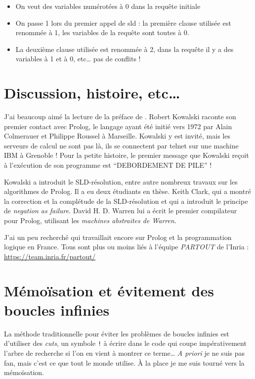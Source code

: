 \documentclass{article}
\begin{document}
\begin{itemize}
  \item
    On veut des variables numérotées à 0 dans la requête initiale
  \item
    On passe 1 lors du premier appel de sld : la première clause utilisée est renommée à 1, les variables de la requête sont toutes à 0.
  \item
    La deuxième clause utilisée est renommée à 2, dans la requête il y a des variables à 1 et à 0, etc\ldots{} pas de conflits !
\end{itemize}



\section{Discussion, histoire, etc\ldots{}}

J'ai beaucoup aimé la lecture de la préface de \cite{Sterling}. Robert Kowalski raconte son premier contact avec Prolog, le langage ayant été initié vers 1972 par Alain Colmerauer et Philippe Roussel à Marseille. Kowalski y est invité, mais les serveurs de calcul ne sont pas là, ils se connectent par telnet sur une machine IBM à Grenoble ! Pour la petite histoire, le premier message que Kowalski reçoit à l'exécution de son programme est ``DEBORDEMENT DE PILE'' !

Kowalski a introduit le SLD-résolution, entre autre nombreux travaux sur les algorithmes de Prolog. Il a eu deux étudiants en thèse. Keith Clark, qui a montré la correction et la complétude de la SLD-résolution et qui a introduit le principe de \emph{negation as failure}. David H. D. Warren lui a écrit le premier compilateur pour Prolog, utilisant les \emph{machines abstraites de Warren}.

J'ai un peu recherché qui travaillait encore sur Prolog et la programmation logique en France. Tous sont plus ou moins liés à l'équipe \emph{PARTOUT} de l'Inria : \url{https://team.inria.fr/partout/}

\section{Mémoïsation et évitement des boucles infinies}

La méthode traditionnelle pour éviter les problèmes de boucles infinies est d'utiliser des \emph{cuts}, un symbole \texttt{!} à écrire dans le code qui coupe impérativement l'arbre de recherche si l'on en vient à montrer ce terme\ldots{} \emph{A priori} je ne suis pas fan, mais c'est ce que tout le monde utilise. À la place je me suis tourné vers la mémoïsation.
\end{document}
